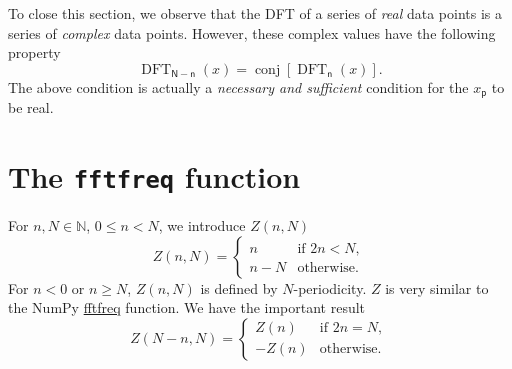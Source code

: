 \documentclass[draft, appendixprefix=true, chapterprefix=true, fontsize=12pt, numbers=noendperiod]{scrbook}
\DeclareMathOperator{\conj}{conj}
\DeclareMathOperator{\dft}{DFT}
\newcommand{\naturals}{\mathbb N}
\newcommand{\tuple}[1]{\mathsf{#1}}
\begin{document}
To close this section, we observe that the DFT of a series of \emph{real} data
points is a series of \emph{complex} data points. However, these complex values
have the following property
\begin{equation}
  \dft_{\tuple{N}-\tuple{n}}(x)=\conj[\dft_{\tuple{n}}(x)].
\end{equation}
The above condition is actually a \emph{necessary and sufficient} condition for
the \(x_{\tuple{p}}\) to be real.

\section{The \texttt{fftfreq} function}

For \(n, N\in\naturals\), \(0\leq n<N\), we introduce \(Z(n, N)\)
\begin{equation}
  Z(n, N)=
  \begin{cases}
    n & \text{if }2n<N,\\
    n-N & \text{otherwise.}
  \end{cases}
\end{equation}
For \(n<0\) or \(n\geq N\), \(Z(n, N)\) is defined by \(N\)-periodicity. \(Z\)
is very similar to the NumPy
\href{https://numpy.org/doc/1.18/reference/generated/numpy.fft.fftfreq.html#numpy.fft.fftfreq}{fftfreq}
function. We have the important result
\begin{equation}
  Z(N-n, N)=
  \begin{cases}
    Z(n) & \text{if }2n=N,\\
    -Z(n) & \text{otherwise.}
  \end{cases}
\end{equation}
\end{document}
